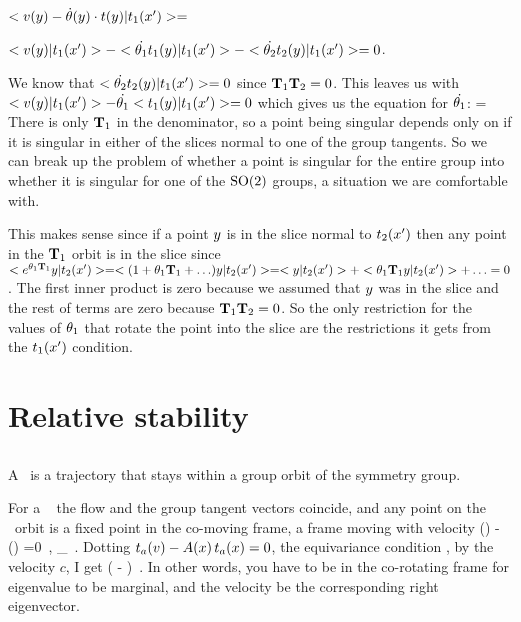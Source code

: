 {$<v(y)-\dot{{\bf \theta}}(y) \cdot t(y)|t_1(x')>=$

$<v(y)|t_1(x')>-<\dot{{\bf \theta}_1} t_1(y)|t_1(x')>-<\dot{{\bf \theta}_2} t_2(y)|t_1(x')>=0$.

We know that
$<\dot{{\bf \theta}_2} t_2(y)|t_1(x')>=0$ since $\mathbf{T}_1 \mathbf{T}_2=0$.
This leaves us with $<v(y)|t_1(x')>-\dot{{\bf \theta}_1}<t_1(y)|t_1(x')>=0$ which gives us the equation for $\dot{{\bf \theta}_1}$:
\beq
{}=
\eeq
There is only $\mathbf{T}_1$ in the denominator, so a point being singular depends only on if it is singular in either of the slices normal to one of the group tangents. So we can break up the problem of whether a point is singular for the entire group into whether it is singular for one of the $\textrm{SO}(2)$ groups, a situation we are comfortable with.

This makes sense since if a point $y$ is in the slice normal to $t_2(x')$ then any point in the $\mathbf{T}_1$ orbit is in the slice since $<e^{{\bf \theta}_1 \mathbf{T}_1}y|t_2(x')>=<(1+{\bf \theta}_1 \mathbf{T}_1+\ldots)y|t_2(x')>=<y|t_2(x')>+<{\bf \theta}_1 \mathbf{T}_1 y|t_2(x')>+\ldots=0$. The first inner product is zero because we assumed that $y$ was in the slice and the rest of terms are zero because $\mathbf{T}_1 \mathbf{T}_2=0$. So the only restriction for the values of ${\bf \theta}_1$ that rotate the point into the slice are the restrictions it gets from the $t_1(x')$ condition.


\section{Relative stability}
\label{sect:relStab}


\subsection{\Reqva}

A \reqv\ is a trajectory that stays
within a group orbit of the symmetry group.

For a \reqv\ \REQV{}{} the flow and the group tangent vectors coincide, and
any point on the \reqv\ orbit is a fixed point in the co-moving frame,
a frame moving with velocity
    \toCB
\beq
\vel(\ssp) - \velRel \cdot \groupTan(\ssp) =0
    \,,\qquad
\ssp \in \pS_{\REQV{}{}}
\,.
Dotting
$
t_a(v)  - A(x) \, t_a(x) =0
$,
the
equivariance condition , by the velocity $c$,
I get
\beq
( \Mvar -  \velRel \cdot \Lg) 
\,.
In other words, you have to be in the co-rotating
frame for eigenvalue to be marginal, and the velocity
be the corresponding right eigenvector.

}

